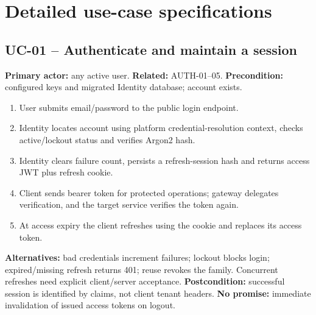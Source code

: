 \documentclass[10pt,a4paper]{article}
\begin{document}
\clearpage
\section{Detailed use-case specifications}\label{app:usecases}
\subsection{UC-01 -- Authenticate and maintain a session}
\textbf{Primary actor:} any active user. \textbf{Related:} AUTH-01--05.
\textbf{Precondition:} configured keys and migrated Identity database; account exists.
\begin{enumerate}
\item User submits email/password to the public login endpoint.
\item Identity locates account using platform credential-resolution context, checks
active/lockout status and verifies Argon2 hash.
\item Identity clears failure count, persists a refresh-session hash and returns access
JWT plus refresh cookie.
\item Client sends bearer token for protected operations; gateway delegates verification,
and the target service verifies the token again.
\item At access expiry the client refreshes using the cookie and replaces its access token.
\end{enumerate}
\textbf{Alternatives:} bad credentials increment failures; lockout blocks login;
expired/missing refresh returns 401; reuse revokes the family. Concurrent refreshes
need explicit client/server acceptance. \textbf{Postcondition:} successful session is
identified by claims, not client tenant headers. \textbf{No promise:} immediate invalidation
of issued access tokens on logout.
\end{document}
